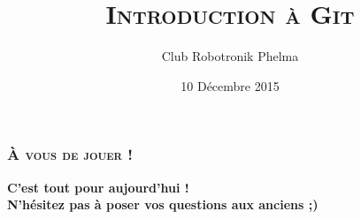 \documentclass[10pt,a9paper,handout]{beamer}
\title{\textsc{Introduction à Git}}
\author{Club Robotronik Phelma}
\date{10 Décembre 2015}
\begin{document}
\setcounter{tocdepth}{1}
\begin{frame} \titlepage       \end{frame}
\begin{frame} \tableofcontents \end{frame}

\section{}
\subsection{}
\begin{frame}

\end{frame}

\section{}
\subsection{}
\begin{frame}
\end{frame}

\section{}
\subsection{}
\begin{frame}

\end{frame}

\section{}
\subsection{}
\begin{frame}
\end{frame}


\begin{frame}
    \frametitle{\textsc{À vous de jouer  !}}
    \begin{center}
    \Large \textbf{C'est tout pour aujourd'hui !\\ N'hésitez pas à poser vos questions aux anciens ;) }
    \end{center}
\end{frame}
\end{document}
